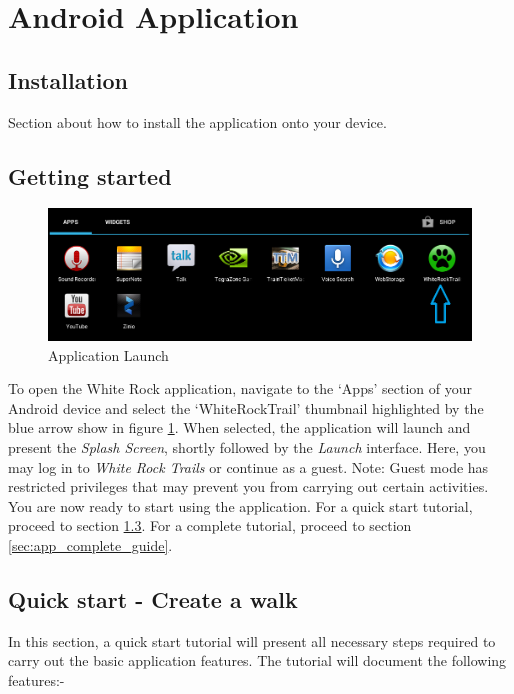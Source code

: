 \documentclass[11pt,a4paper]{report}
\begin{document}
\section{Android Application}
\label{user_manual_application}

\subsection{Installation}

Section about how to install the application onto your device.

\subsection{Getting started}

\begin{figure}[H]
\centering
\includegraphics[width=0.8\linewidth]{./img/chris/app_thumb}
\caption{Application Launch}
\label{fig:app_thumb}
\end{figure}

To open the White Rock application, navigate to the `Apps' section of your Android device and select the `WhiteRockTrail' thumbnail highlighted by the blue arrow show in figure \ref{fig:app_thumb}. When selected, the application will launch and present the \emph{Splash Screen}, shortly followed by the \emph{Launch} interface. Here, you may log in to \emph{White Rock Trails} or continue as a guest. Note: Guest mode has restricted privileges that may prevent you from carrying out certain activities.\\

You are now ready to start using the application. For a quick start tutorial, proceed to section \ref{sec:app_quick_start}. For a complete tutorial, proceed to section \ref{sec:app_complete_guide}. 

\subsection{Quick start - Create a walk}
\label{sec:app_quick_start}
In this section, a quick start tutorial will present all necessary steps required to carry out the basic application features. The tutorial will document the following features:-
\end{document}
